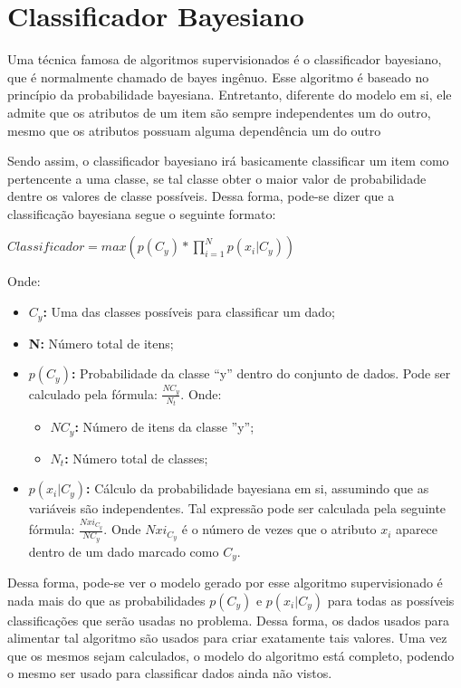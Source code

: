 \section{Classificador Bayesiano} \label{sec:classificador_bayesiano}

Uma técnica famosa de algoritmos supervisionados é o classificador bayesiano,
que é normalmente chamado de bayes ingênuo. Esse algoritmo é baseado no
princípio da probabilidade bayesiana. Entretanto, diferente do modelo em si,
ele admite que os atributos de um item são sempre independentes um do outro,
mesmo que os atributos possuam alguma dependência um do outro \cite{segaran2007programming}

Sendo assim, o classificador bayesiano irá basicamente classificar um item
como pertencente a uma classe, se tal classe obter o maior valor de
probabilidade dentre os valores de classe possíveis. Dessa forma, pode-se
dizer que a classificação bayesiana segue o seguinte formato:

$Classificador = max(p(C_{y})*\prod_{i=1}^{N}p(x_{i}|C_{y}))$

Onde:

\begin{itemize}
    \item \textbf{$C_{y}$: } Uma das classes possíveis para classificar um
    dado;
    \item \textbf{N: } Número total de itens;
    \item \textbf{$p(C_{y})$: } Probabilidade da classe ``y'' dentro do
    conjunto de dados. Pode ser calculado pela
    fórmula: $\frac{NC_{y}}{N_{t}}$.
    Onde:
      \begin{itemize}
          \item \textbf{$NC_{y}$: } Número de itens da classe ''y'';
          \item \textbf{$N_{t}$: } Número total de classes;
      \end{itemize}
    \item \textbf{$p(x_{i}|C_{y})$: } Cálculo da probabilidade bayesiana
    em si, assumindo que as variáveis são independentes. Tal expressão
    pode ser calculada pela seguinte fórmula: $\frac{Nxi_{C_{y}}}{NC_{y}}$.
    Onde $Nxi_{C_{y}}$ é o número de vezes que o atributo $x_{i}$ aparece
    dentro de um dado marcado como $C_{y}$.
\end{itemize}

Dessa forma, pode-se ver o modelo gerado por esse algoritmo supervisionado
é nada mais do que as probabilidades $p(C_{y})$ e $p(x_{i}|C_{y})$ para
todas as possíveis classificações que serão usadas no problema. Dessa forma,
os dados usados para alimentar tal algoritmo são usados para criar exatamente tais
valores. Uma vez que os mesmos sejam calculados, o modelo do algoritmo está completo,
podendo o mesmo ser usado para classificar dados ainda não vistos.

